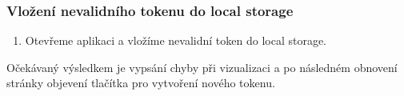 \documentclass[czech, bc, kiv, he, iso690numb]{fasthesis}
\begin{document}
\subsubsection{Vložení nevalidního tokenu do local storage}
\begin{enumerate}
	\item Otevřeme aplikaci a vložíme nevalidní token do local storage.
\end{enumerate}
Očekávaný výsledkem je vypsání chyby při vizualizaci a po následném obnovení stránky objevení tlačítka pro vytvoření nového tokenu.



\backmatter
\printbibliography
\listoffigures
\listoftables
\listoflistings
%
%
\setbackpageqrcode
\backpage
\end{document}
